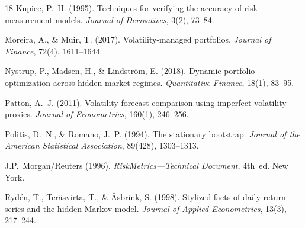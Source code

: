 \documentclass[11pt]{article}
\begin{document}
\begin{thebibliography}{18}
Kupiec, P.~H. (1995). Techniques for verifying the accuracy of risk
measurement models. \emph{Journal of Derivatives}, 3(2), 73--84.

Moreira, A., \& Muir, T. (2017). Volatility-managed portfolios.
\emph{Journal of Finance}, 72(4), 1611--1644.

Nystrup, P., Madsen, H., \& Lindstr\"om, E. (2018). Dynamic portfolio
optimization across hidden market regimes. \emph{Quantitative Finance},
18(1), 83--95.

Patton, A.~J. (2011). Volatility forecast comparison using imperfect
volatility proxies. \emph{Journal of Econometrics}, 160(1), 246--256.

Politis, D.~N., \& Romano, J.~P. (1994). The stationary bootstrap.
\emph{Journal of the American Statistical Association}, 89(428),
1303--1313.

J.P.~Morgan/Reuters (1996). \emph{RiskMetrics---Technical Document},
4th~ed. New York.

Ryd\'en, T., Ter\"asvirta, T., \& \AA sbrink, S. (1998). Stylized facts of
daily return series and the hidden Markov model. \emph{Journal of Applied
Econometrics}, 13(3), 217--244.
\end{thebibliography}
\end{document}
